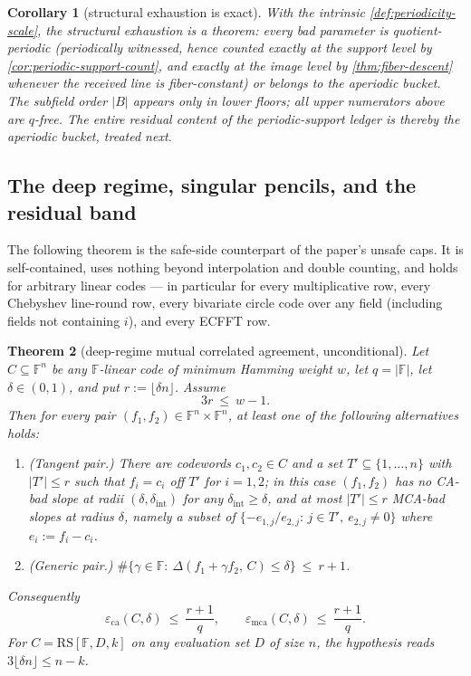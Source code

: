 \documentclass[11pt]{article}
\newtheorem{theorem}{Theorem}[section]
\newtheorem{corollary}[theorem]{Corollary}
\theoremstyle{definition}
\theoremstyle{remark}
\newcommand{\F}{\mathbb{F}}
\newcommand{\B}{B}
\newcommand{\RS}{\mathrm{RS}}
\newcommand{\eca}{\varepsilon_{\mathrm{ca}}}
\newcommand{\emca}{\varepsilon_{\mathrm{mca}}}
\newcommand{\dist}{\Delta}
\begin{document}
\begin{corollary}[structural exhaustion is exact]\label{cor:T1-status}
With the intrinsic \cref{def:periodicity-scale}, the structural exhaustion is a theorem: every bad parameter is quotient-periodic \textup(periodically witnessed, hence counted exactly at the support level by \cref{cor:periodic-support-count}, and exactly at the image level by \cref{thm:fiber-descent} whenever the received line is fiber-constant\textup) or belongs to the aperiodic bucket. The subfield order $|\B|$ appears only in lower floors; all upper numerators above are $q$-free. The entire residual content of the periodic-support ledger is thereby the aperiodic bucket, treated next.
\end{corollary}

\subsection{The deep regime, singular pencils, and the residual band}\label{sec:discharge-T2}

The following theorem is the safe-side counterpart of the paper's unsafe caps. It is self-contained, uses nothing beyond interpolation and double counting, and holds for arbitrary linear codes --- in particular for every multiplicative row, every Chebyshev line-round row, every bivariate circle code over any field \textup(including fields not containing $i$\textup), and every ECFFT row.

\begin{theorem}[deep-regime mutual correlated agreement, unconditional]\label{thm:deep-mca}
Let $C\subseteq\F^n$ be any $\F$-linear code of minimum Hamming weight $w$, let $q=|\F|$, let $\delta\in(0,1)$, and put $r:=\lfloor\delta n\rfloor$. Assume
\[
3r\ \le\ w-1 .
\]
Then for every pair $(f_1,f_2)\in\F^n\times\F^n$, at least one of the following alternatives holds:
\begin{enumerate}[label=\textup{(\alph*)}]
\item \textup{(Tangent pair.)} There are codewords $c_1,c_2\in C$ and a set $T'\subseteq\{1,\dots,n\}$ with $|T'|\le r$ such that $f_i=c_i$ off $T'$ for $i=1,2$; in this case $(f_1,f_2)$ has no CA-bad slope at radii $(\delta,\delta_{\mathrm{int}})$ for any $\delta_{\mathrm{int}}\ge\delta$, and at most $|T'|\le r$ MCA-bad slopes at radius $\delta$, namely a subset of $\{-e_{1,j}/e_{2,j}:\,j\in T',\ e_{2,j}\ne0\}$ where $e_i:=f_i-c_i$.
\item \textup{(Generic pair.)} $\#\{\gamma\in\F:\ \dist(f_1+\gamma f_2,\,C)\le\delta\}\ \le\ r+1$.
\end{enumerate}
Consequently
\[
\eca(C,\delta)\ \le\ \frac{r+1}q,
\qquad
\emca(C,\delta)\ \le\ \frac{r+1}q .
\]
For $C=\RS[\F,D,k]$ on any evaluation set $D$ of size $n$, the hypothesis reads $3\lfloor\delta n\rfloor\le n-k$.
\end{theorem}
\end{document}
